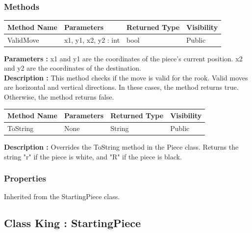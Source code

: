 \documentclass[12pt]{article}
\begin{document}
\subsubsection{Methods}

\begin{table}[H]
    \begin{tabular}{|l|l|l|l|}
    \hline
    \rowcolor[HTML]{EFEFEF} 
    \cellcolor[HTML]{EFEFEF}\textbf{Method Name} & \textbf{Parameters}  & \textbf{Returned Type} & \textbf{Visibility} \\ \hline
    ValidMove                          & x1, y1, x2, y2 : int & bool                   & Public              \\ \hline
    \end{tabular}
\end{table}

    \textbf{Parameters :} x1 and y1 are the coordinates of the piece's current position. x2 and y2 are the coordinates of the destination. 
\\
    \textbf{Description :} This method checks if the move is valid for the rook. 
    Valid moves are horizontal and vertical directions.
    In these cases, the method returns true.
    Otherwise, the method returns false.
\begin{table}[H]
    \begin{tabular}{|l|l|l|l|}
    \hline
    \rowcolor[HTML]{EFEFEF} 
    \cellcolor[HTML]{EFEFEF}\textbf{Method Name} & \textbf{Parameters}  & \textbf{Returned Type} & \textbf{Visibility} \\ \hline
    ToString                                   & None                 & String                   & Public              \\ \hline
    \end{tabular}
\end{table}

    \textbf{Description :} Overrides the ToString method in the Piece class.
    Returns the string "r" if the piece is white, and "R" if the piece is black. 

\subsubsection{Properties}

    Inherited from the StartingPiece class.
\newpage


\subsection{Class King : StartingPiece}
\end{document}
